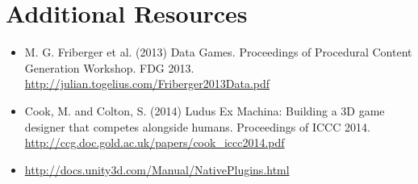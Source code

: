 \documentclass{../fal_assignment}
\begin{document}
\section*{Additional Resources}

\begin{itemize}
    \item M. G. Friberger et al. (2013) Data Games. Proceedings of Procedural Content Generation Workshop. FDG 2013.
        \url{http://julian.togelius.com/Friberger2013Data.pdf}
    \item Cook, M. and Colton, S. (2014) Ludus Ex Machina: Building a 3D game designer that competes alongside humans. Proceedings of ICCC 2014.
        \url{http://ccg.doc.gold.ac.uk/papers/cook_iccc2014.pdf}
    \item \url{http://docs.unity3d.com/Manual/NativePlugins.html}
\end{itemize}
\end{document}
